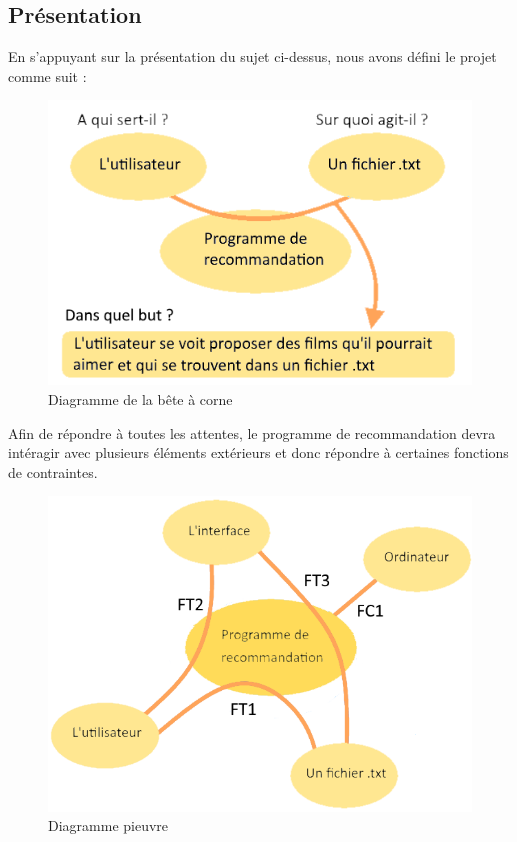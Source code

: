 \documentclass{article}
\begin{document}
\subsection{Présentation}


En s'appuyant sur la présentation du sujet ci-dessus, nous avons défini le projet comme suit :

\begin{figure}[H]
    \centering
    \includegraphics[scale=0.5]{GDP/bete.png}
    \caption{\label{bete} Diagramme de la bête à corne}
\end{figure}

Afin de répondre à toutes les attentes, le programme de recommandation devra intéragir avec plusieurs éléments extérieurs et donc répondre à certaines fonctions de contraintes.

\begin{figure}[H]
    \centering
    \includegraphics[scale=0.5]{GDP/pieuvre.png}
    \caption{\label{pieuvre} Diagramme pieuvre}
\end{figure}
\end{document}
